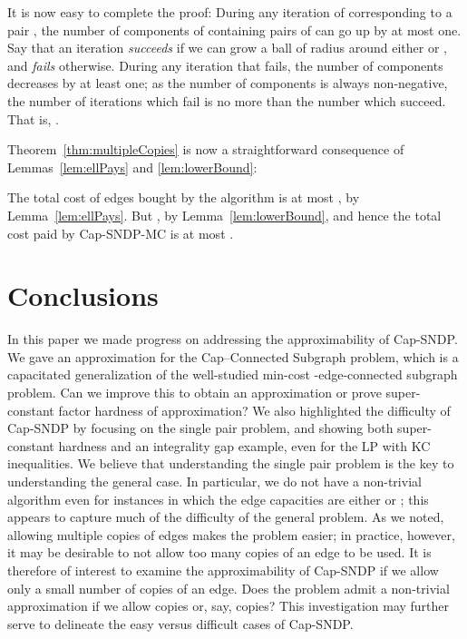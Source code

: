 \documentclass[11pt]{article}
\newcounter{thm0Rcopies}
\newcounter{thm_saved}
\def\capR{Cap--Connected Subgraph\xspace}
\renewenvironment{proof}{\vspace{-0.1in}\noindent{\bf Proof:}}{\hspace*{\fill}\par}
\newenvironment{proofof}[1]{\smallskip\noindent{\bf Proof of #1:}}{\hspace*{\fill}\par}
\begin{document}
\begin{proof}
\begin{proofof}{Claim \ref{claim:balls}}
    It is now easy to complete the proof: During any iteration of 
    corresponding to a pair , the number of
    components of  containing pairs of  can go up by at most
    one. Say that an iteration \emph{succeeds} if we can grow a ball
    of radius  around either  or , and \emph{fails}
    otherwise.  During any iteration that fails, the number of
    components decreases by at least one; as the number of components
    is always non-negative, the number of iterations which fail is no
    more than the number which succeed. That is, .
  \end{proofof}
\end{proof}

Theorem~\ref{thm:multipleCopies} is now a straightforward consequence
of Lemmas~\ref{lem:ellPays} and \ref{lem:lowerBound}:

\begin{proofof}{Theorem~\ref{thm:multipleCopies}}
  The total cost of edges bought by the algorithm is at most
  , by
  Lemma~\ref{lem:ellPays}. But , by Lemma~\ref{lem:lowerBound}, and hence the total
  cost paid by {\sc Cap-SNDP-MC} is at most . 
\end{proofof}




\section{Conclusions} \label{sec:conclusions} 

In this paper we made progress on addressing the approximability of
Cap-SNDP. We gave an  approximation for the \capR problem,
which is a capacitated generalization of the well-studied min-cost
-edge-connected subgraph problem. Can we improve this to obtain an
 approximation or prove super-constant factor hardness of
approximation? We also highlighted the difficulty of Cap-SNDP by
focusing on the single pair problem, and showing both super-constant
hardness and an  integrality gap example, even for the LP
with KC inequalities. We believe that understanding the single pair
problem is the key to understanding the general case. In particular,
we do not have a non-trivial algorithm even for instances in which the
edge capacities are either  or ; this appears to capture much of
the difficulty of the general problem. As we noted, allowing multiple
copies of edges makes the problem easier; in practice, however, it may
be desirable to not allow too many copies of an edge to be used. It is
therefore of interest to examine the approximability of Cap-SNDP if we
allow only a small number of copies of an edge. Does the problem admit
a non-trivial approximation if we allow  copies or, say,  copies? This investigation may further serve to delineate the easy
versus difficult cases of Cap-SNDP.
\end{document}
